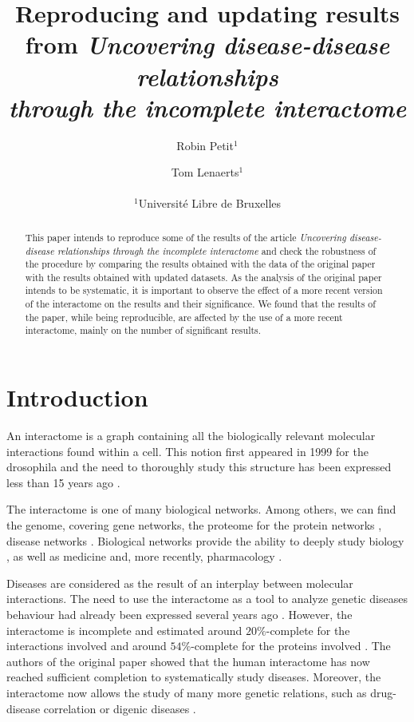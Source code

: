 \documentclass[letterpaper]{article}
\title{Reproducing and updating results from
\textit{Uncovering disease-disease relationships\\through the incomplete interactome}}
\author{Robin Petit$^{1}$ \and Tom Lenaerts$^{1}$\\
\mbox{}\\
$^1$Université Libre de Bruxelles}
\begin{document}
\maketitle

\begin{abstract}
This paper intends to reproduce some of the results of the article \textit{Uncovering
disease-disease relationships through the incomplete interactome} \citep{originalPaper}
and check the robustness of the procedure by comparing the results obtained with the data
of the original paper with the results obtained with updated datasets. As the analysis of
the original paper intends to be systematic, it is important to observe the effect of a
more recent version of the interactome on the results and their significance. We found that
the results of the paper, while being reproducible, are affected by the use of a more recent
interactome, mainly on the number of significant results.
\end{abstract}

\section{Introduction}
An interactome is a graph containing all the biologically relevant molecular interactions found within
a cell. This notion first appeared in 1999 for the drosophila \citep{sanchez1999grasping} and the need
to thoroughly study this structure has been expressed less than 15 years ago
\citep{UnderstandingTheCellFunctionalOrganization}.

The interactome is one of many biological networks. Among others, we can find the genome, covering
gene networks, the proteome for the protein networks \citep{rolland2014proteome}, disease networks
\citep{goh2007human}. Biological networks provide the ability to deeply study biology
\citep{UnderstandingTheCellFunctionalOrganization}, as well as medicine \citep{barabasi2011network} and,
more recently, pharmacology \citep{hopkins2008network}.

Diseases are considered as the result of an interplay between molecular interactions. The need to use
the interactome as a tool to analyze genetic diseases behaviour had already been expressed several years
ago \citep{vidal2011interactome}. However, the interactome is incomplete and estimated around $20\%$-complete
for the interactions involved and around $54\%$-complete for the proteins involved
\citep{ATruerMeasureOfOurIgnorance,estimatingTheSizeOfTheHumanInteractome}. The authors of the original paper
\citep{originalPaper} showed that the human interactome has now reached sufficient completion to systematically
study diseases. Moreover, the interactome now allows the study of many more genetic relations, such as
drug-disease correlation \citep{Yu2016extraction} or digenic diseases \citep{gazzo2015dida}.
\end{document}
